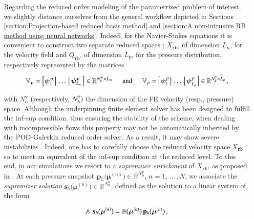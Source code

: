 \documentclass[longtitle]{elsarticle}
\numberwithin{equation}{section}
\theoremstyle{theorem}
\theoremstyle{definition}
\theoremstyle{remark}
\theoremstyle{proposition}
\numberwithin{figure}{section}
\newcommand{\bg}[1]{\boldsymbol{#1}}
\begin{document}
		Regarding the reduced order modeling of the parametrized problem of interest, we slightly distance ourselves from the general workflow depicted in Sections \ref{section:Projection-based reduced basis method} and \ref{section:A non-intrusive RB method using neural networks}. Indeed, for the Navier-Stokes equations it is convenient to construct two separate reduced spaces \cite{Bal14, Chen17, QMN15}: $X_{\texttt{rb}}$, of dimension $L_{\bg{v}}$, for the velocity field and $Q_{\texttt{rb}}$, of dimension $L_p$, for the pressure distribution, respectively represented by the matrices 
		\begin{linenomath}\begin{equation*}
			\mathbb{V}_{\bg{v}} = \left[ \bg{\psi}_1^{\bg{v}} \, \big| \, \ldots \, \big| \, \bg{\psi}_{L_{\bg{v}}}^{\bg{v}} \right] \in \mathbb{R}^{N_h^{\bg{v}} \times L_{\bg{v}}} \hspace*{0.5cm} \text{and} \hspace*{0.5cm} \mathbb{V}_p = \left[ \bg{\psi}_1^p \, \big| \, \ldots \, \big| \, \bg{\psi}_{L_p}^p \right] \in \mathbb{R}^{N_h^p \times L_p} \, ,
		\end{equation*}\end{linenomath} 
		with $N_h^{\bg{v}}$ (respectively, $N_h^p$) the dimension of the FE velocity (resp., pressure) space. Although the underpinning finite element solver has been designed to fulfill the inf-sup condition, thus ensuring the stability of the scheme, when dealing with incompressible flows this property may not be automatically inherited by the POD-Galerkin reduced order solver. As a result, it may show severe instabilities \cite{Bur06}. Indeed, one has to carefully choose the reduced velocity space $X_{\texttt{rb}}$ so to meet an equivalent of the inf-sup condition at the reduced level. To this end, in our simulations we resort to a \emph{supremizer enrichment} of $X_{\texttt{rb}}$, as proposed in \cite{Bal14}. At each pressure snapshot $\mathbf{p}_h \big( \bg{\mu}^{(n)} \big) \in \mathbb{R}^{N_h^p}$, $n = 1, \, \ldots \, , N$, we associate the \emph{supremizer solution} $\mathbf{s}_h \big( \bg{\mu}^{(n)} \big) \in \mathbb{R}^{N_h^{\bg{v}}}$, defined as the solution to a linear system of the form
		\vspace*{-0.1cm}
		\begin{linenomath}\begin{equation*}
			\mathbb{A} \,\, \mathbf{s}_h \big( \bg{\mu}^{(n)} \big) = \mathbb{B} \big( \bg{\mu}^{(n)} \big) \, \mathbf{p}_h \big( \bg{\mu}^{(n)} \big) \, ,
			\vspace*{-0.1cm}
		\end{equation*}\end{linenomath}
\end{document}
